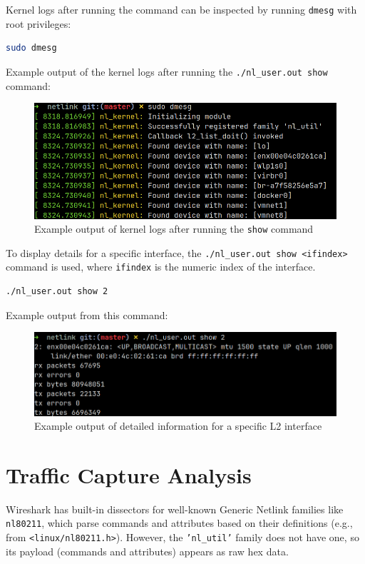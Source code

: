 \documentclass[10pt, letterpaper]{article}
\begin{document}
Kernel logs after running the command can be inspected by running \texttt{dmesg} with root
privileges:
\begin{lstlisting}[language={Bash}, caption={Showing last kernel logs}]
sudo dmesg 
\end{lstlisting}

Example output of the kernel logs after running the \texttt{./nl\_user.out show} command:
\begin{figure}[ht]
	\centering
	\includegraphics[width=1\textwidth]{./images/dmesg_output.png}
	\caption{Example output of kernel logs after running the \texttt{show} command}
\end{figure}

To display details for a specific interface, the \texttt{./nl\_user.out show <ifindex>}
command is used, where \texttt{ifindex} is the numeric index of the interface.
\begin{lstlisting}[language={Bash}, caption={Displaying interface details}]
./nl_user.out show 2
\end{lstlisting}

Example output from this command:
\begin{figure}[ht]
	\centering
	\includegraphics[width=1\textwidth]{./images/show_ifidx_output.png}
	\caption{Example output of detailed information for a specific L2 interface}
\end{figure}

\newpage

\section{Traffic Capture Analysis}
Wireshark has built-in dissectors for well-known Generic Netlink families like
\texttt{nl80211}, which parse commands and attributes based on their definitions (e.g.,
from \texttt{<linux/nl80211.h>}). However, the \texttt{'nl\_util'} family does not have
one, so its payload (commands and attributes) appears as raw hex data.
\end{document}
